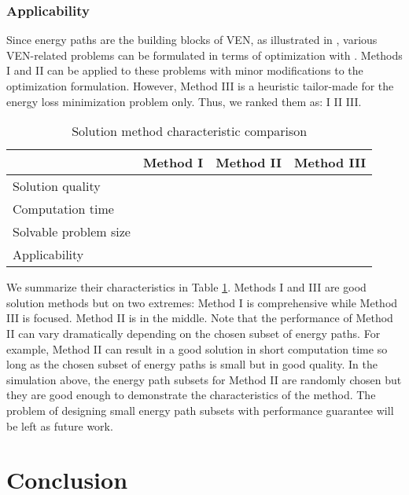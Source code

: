 \documentclass[journal]{IEEEtran}
\begin{document}
\subsubsection{Applicability}
Since energy paths are the building blocks of VEN, as illustrated in \cite{VEN}, various VEN-related problems can be formulated in terms of optimization with . Methods I and II can be applied to these problems with minor modifications to the optimization formulation. However, Method III is a heuristic  tailor-made for the energy loss minimization problem only. Thus, we ranked them as: I  II  III.

\begin{table}[!t]
\renewcommand{\arraystretch}{1.1}
\caption{Solution method characteristic comparison}
\label{tab:comparison}
\centering
\begin{tabular}{p{2.5cm}|c | c|c}
\hline\hline
				& Method I 	& Method II & Method III 	\\
\hline
Solution quality & 		& 	&  \\
Computation time		& 	&  &   \\
Solvable problem size &	 		&  	& 	\\
Applicability			 &  		&  &  \\
\hline\hline
\end{tabular}
\end{table}

We summarize their characteristics in Table  \ref{tab:comparison}. Methods I and III are good solution methods but  on two extremes: Method I is  comprehensive while Method III is focused. Method II is in the middle. Note that the performance of Method II can vary dramatically depending on the chosen subset of energy paths. For example, Method II can result in a good solution in short computation time so long as the chosen subset of energy paths is small but in good quality.
In the simulation above, the energy path subsets for Method II are randomly chosen but they are good enough to demonstrate the characteristics of the method. The problem of designing small energy path subsets with performance guarantee will be left as future work.  






\section{Conclusion} \label{sec:conclusion}
\end{document}

